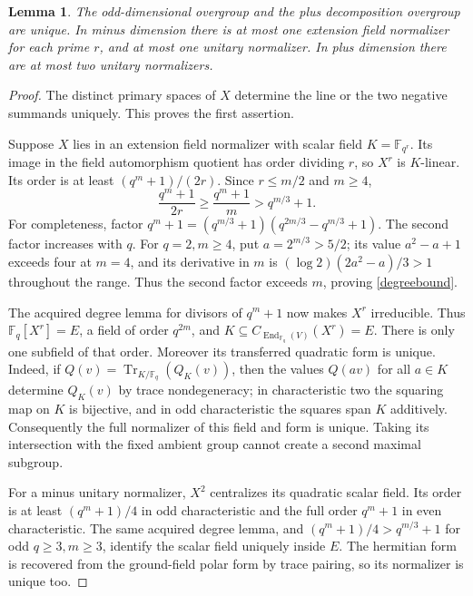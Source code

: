 \documentclass[11pt,a4paper]{article}
\newtheorem{lemma}{Lemma}\newtheorem{proposition}[lemma]{Proposition}
\newcommand{\F}{\mathbb F}\newcommand{\Om}{\Omega}
\newcommand{\Tr}{\operatorname{Tr}}
\begin{document}
\begin{lemma}\label{multiplicity}
The odd-dimensional overgroup and the plus decomposition overgroup
are unique. In minus dimension there is at most one extension field
normalizer for each prime $r$, and at most one unitary normalizer.
In plus dimension there are at most two unitary normalizers.
\end{lemma}
\begin{proof}
The distinct primary spaces of $X$ determine the line or the two
negative summands uniquely. This proves the first assertion.

Suppose $X$ lies in an extension field normalizer with scalar field
$K=\F_{q^r}$. Its image in the field automorphism quotient has order
dividing $r$, so $X^r$ is $K$-linear. Its order is at least
$(q^m+1)/(2r)$. Since $r\le m/2$ and $m\ge4$,
\begin{equation}\label{degreebound}
            \frac{q^m+1}{2r}\ge\frac{q^m+1}{m}>q^{m/3}+1.
\end{equation}
For completeness, factor
$q^m+1=(q^{m/3}+1)(q^{2m/3}-q^{m/3}+1)$. The second factor
increases with $q$. For $q=2,m\ge4$, put $a=2^{m/3}>5/2$;
its value $a^2-a+1$ exceeds four at $m=4$, and its derivative
in $m$ is $(\log2)(2a^2-a)/3>1$ throughout the range.
Thus the second factor exceeds $m$, proving \eqref{degreebound}.

The acquired degree lemma for divisors of $q^m+1$ now makes $X^r$
irreducible. Thus $\F_q[X^r]=E$, a field of order $q^{2m}$, and
$K\subseteq C_{\operatorname{End}_{\F_q}(V)}(X^r)=E$. There is only
one subfield of that order. Moreover its transferred quadratic form
is unique. Indeed, if $Q(v)=\Tr_{K/\F_q}(Q_K(v))$, then the values
$Q(av)$ for all $a\in K$ determine $Q_K(v)$ by trace nondegeneracy;
in characteristic two the squaring map on $K$ is bijective, and in odd
characteristic the squares span $K$ additively. Consequently the full
normalizer of this field and form is unique. Taking its intersection
with the fixed ambient group cannot create a second maximal subgroup.

For a minus unitary normalizer, $X^2$ centralizes its quadratic scalar
field. Its order is at least $(q^m+1)/4$ in odd characteristic and the
full order $q^m+1$ in even characteristic. The same acquired degree
lemma, and $(q^m+1)/4>q^{m/3}+1$ for odd $q\ge3,m\ge3$, identify
the scalar field uniquely inside $E$. The hermitian form is recovered
from the ground-field polar form by trace pairing, so its normalizer
is unique too.


\end{proof}
\end{document}
